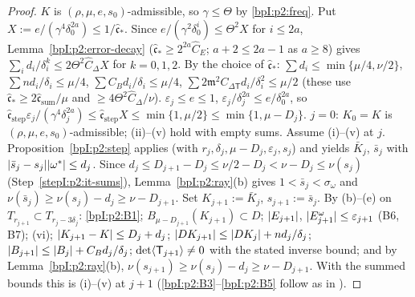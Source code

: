 \begin{proof}
\label{stepI:p2:it-sums}
$K$ is $(\rho,\mu,e,s_0)$-admissible, so $\gamma\le\Theta$ by \eqref{bpI:p2:freq}. Put $X:=e/(\gamma^4\delta_0^{2a})\le1/\hat{\mathfrak c}_*$. Since $e/(\gamma^2\delta_0^i)\le\Theta^2X$ for $i\le2a$, Lemma~\ref{bpI:p2:error-decay} ($\hat{\mathfrak c}_*\ge2^{2a}\hat C_E$; $a+2\le2a-1$ as $a\ge8$) gives
$\sum_id_i/\delta_i^k\le2\Theta^2\hat C_\Delta X$ for $k=0,1,2$. By the choice of $\hat{\mathfrak c}_*$: $\sum d_i\le\min\{\mu/4,\nu/2\}$, $\sum nd_i/\delta_i\le\mu/4$, $\sum C_Bd_i/\delta_i\le\mu/4$, $\sum2\mathfrak m^2C_{\Delta\mathsf T}d_i/\delta_i^2\le\mu/2$ (these use $\hat{\mathfrak c}_*\ge2\hat{\mathfrak c}_{\mathrm{sum}}/\mu$ and $\ge4\Theta^2\hat C_\Delta/\nu$).
\label{stepI:p2:it-stepsmall}
$\varepsilon_j\le e\le1$, $\varepsilon_j/\delta_j^{2a}\le e/\delta_0^{2a}$, so $\hat{\mathfrak c}_{\mathrm{step}}\varepsilon_j/(\gamma^4\delta_j^{2a})\le\hat{\mathfrak c}_{\mathrm{step}}X\le\min\{1,\mu/2\}\le\min\{1,\mu-D_j\}$.
\label{stepI:p2:it-step}
$j=0$: $K_0=K$ is $(\rho,\mu,e,s_0)$-admissible; (ii)--(v) hold with empty sums. Assume (i)--(v) at $j$. Proposition~\ref{bpI:p2:step} applies (with $r_j,\delta_j,\mu-D_j,\varepsilon_j,s_j$) and yields $\bar K_j$, $\bar s_j$ with $\lvert \bar s_j-s_j\rvert\lvert \omega^*\rvert\le d_j$. Since $d_j\le D_{j+1}-D_j\le\nu/2-D_j<\nu-D_j\le\nu(s_j)$ (Step~\ref{stepI:p2:it-sums}), Lemma~\ref{bpI:p2:ray}(b) gives $1<\bar s_j<\sigma_\omega$ and $\nu(\bar s_j)\ge\nu(s_j)-d_j\ge\nu-D_{j+1}$. Set $K_{j+1}:=\bar K_j$, $s_{j+1}:=\bar s_j$. By (b)--(e) on $T_{r_{j+1}}\subset T_{r_j-3\delta_j}$: \ref{bpI:p2:B1}; $B_{\mu-D_{j+1}}(K_{j+1})\subset D$; $\lvert E_{j+1}\rvert$, $\lvert E^\omega_{j+1}\rvert\le\varepsilon_{j+1}$ (B6, B7); (vi); $\lvert K_{j+1}-K\rvert\le D_j+d_j$; $\lvert DK_{j+1}\rvert\le\lvert DK_j\rvert+nd_j/\delta_j$; $\lvert B_{j+1}\rvert\le\lvert B_j\rvert+C_Bd_j/\delta_j$; $\det\langle \mathsf T_{j+1}\rangle\ne0$ with the stated inverse bound; and by Lemma~\ref{bpI:p2:ray}(b), $\nu(s_{j+1})\ge\nu(s_j)-d_j\ge\nu-D_{j+1}$. With the summed bounds this is (i)--(v) at $j+1$ (\ref{bpI:p2:B3}--\ref{bpI:p2:B5} follow as in ).
\end{proof}

